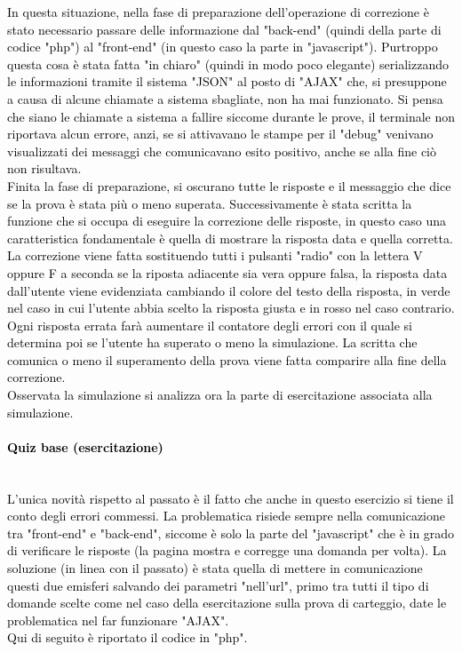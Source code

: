 \textcolor{black}{In questa situazione, nella fase di preparazione dell'operazione di correzione è stato necessario passare delle informazione dal "back-end" (quindi della parte di codice "php") al "front-end" (in questo caso la parte in "javascript"). Purtroppo questa cosa è stata fatta "in chiaro" (quindi in modo poco elegante) serializzando le informazioni tramite il sistema "JSON" al posto di "AJAX" che, si presuppone a causa di alcune chiamate a sistema sbagliate, non ha mai funzionato. Si pensa che siano le chiamate a sistema a fallire siccome durante le prove, il terminale non riportava alcun errore, anzi, se si attivavano le stampe per il "debug" venivano visualizzati dei messaggi che comunicavano esito positivo, anche se alla fine ciò non risultava.\\
Finita la fase di preparazione, si oscurano tutte le risposte e il messaggio che dice se la prova è stata più o meno superata. Successivamente è stata scritta la funzione che si occupa di eseguire la correzione delle risposte, in questo caso una caratteristica fondamentale è quella di mostrare la risposta data e quella corretta. La correzione viene fatta sostituendo tutti i pulsanti "radio" con la lettera V oppure F a seconda se la riposta adiacente sia vera oppure falsa, la risposta data dall'utente viene evidenziata cambiando il colore del testo della risposta, in verde nel caso in cui l'utente abbia scelto la risposta giusta e in rosso nel caso contrario. Ogni risposta errata farà aumentare il contatore degli errori con il quale si determina poi se l'utente ha superato o meno la simulazione. La scritta che comunica o meno il superamento della prova viene fatta comparire alla fine della correzione.}\\
\bigskip
\textcolor{black}{Osservata la simulazione si analizza ora la parte di esercitazione associata alla simulazione.}\\

\paragraph{\textcolor{black}{Quiz base (esercitazione)}}\leavevmode\\
\textcolor{black}{L'unica novità rispetto al passato è il fatto che anche in questo esercizio si tiene il conto degli errori commessi. La problematica risiede sempre nella comunicazione tra "front-end" e "back-end", siccome è solo la parte del "javascript" che è in grado di verificare le risposte (la pagina mostra e corregge una domanda per volta). La soluzione (in linea con il passato) è stata quella di mettere in comunicazione questi due emisferi salvando dei parametri "nell'url", primo tra tutti il tipo di domande scelte come nel caso della esercitazione sulla prova di carteggio, date le problematica nel far funzionare "AJAX".\\
Qui di seguito è riportato il codice in "php".}\\

